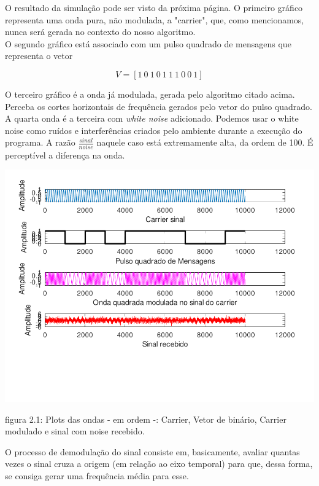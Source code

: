 \documentclass[11pt,a4paper]{report}
\begin{document}
	O resultado da simulação pode ser visto da próxima página. O primeiro gráfico representa uma onda pura, não modulada, a "carrier", que, como mencionamos, nunca será gerada no contexto do nosso algoritmo.\\
	
	O segundo gráfico está associado com um pulso quadrado de mensagens que representa o vetor 
	
	\[V = [1\ 0\ 1\ 0\ 1\ 1\ 1\ 0\ 0\ 1]\]
	
	O terceiro gráfico é a onda já modulada, gerada pelo algoritmo citado acima. Perceba os cortes horizontais de frequência gerados pelo vetor do pulso quadrado.\\
	
	A quarta onda é a terceira com {\it white noise} adicionado. Podemos usar o white noise como ruídos e interferências criados pelo ambiente durante a execução do programa. A razão $\frac{sinal}{noise}$ naquele caso está extremamente alta, da ordem de 100. É perceptível a diferença na onda.
	\begin{center}
	
	\includegraphics[clip, trim=0.0cm 0cm 0.0cm 0.0cm, width=1.00\textwidth]{sinais}
	
	\end{center}

\begin{center}
	{\footnotesize figura 2.1: Plots das ondas - em ordem -: Carrier, Vetor de binário, Carrier modulado e sinal com noise recebido.}
\end{center}

		O processo de demodulação do sinal consiste em, basicamente, avaliar quantas vezes o sinal cruza a origem (em relação ao eixo temporal) para que, dessa forma, se consiga gerar uma frequência média para esse.\\
		
\end{document}
